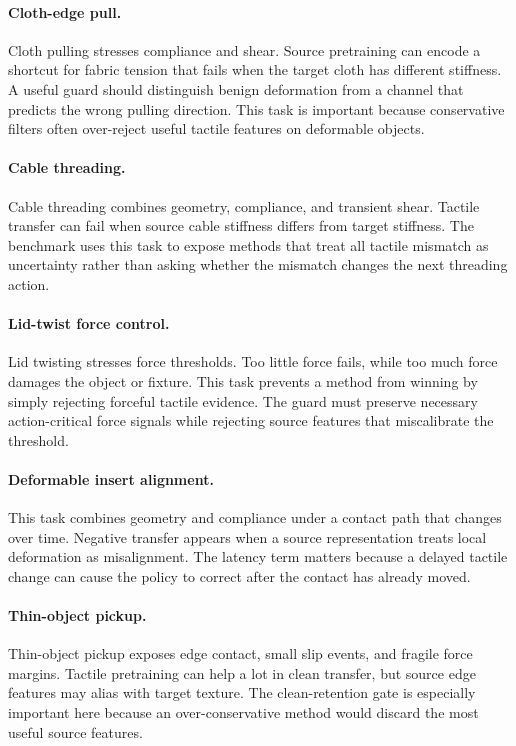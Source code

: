 \documentclass{article}
\begin{document}
\paragraph{Cloth-edge pull.}
Cloth pulling stresses compliance and shear. Source pretraining can encode a shortcut for fabric tension that fails when the target cloth has different stiffness. A useful guard should distinguish benign deformation from a channel that predicts the wrong pulling direction. This task is important because conservative filters often over-reject useful tactile features on deformable objects.

\paragraph{Cable threading.}
Cable threading combines geometry, compliance, and transient shear. Tactile transfer can fail when source cable stiffness differs from target stiffness. The benchmark uses this task to expose methods that treat all tactile mismatch as uncertainty rather than asking whether the mismatch changes the next threading action.

\paragraph{Lid-twist force control.}
Lid twisting stresses force thresholds. Too little force fails, while too much force damages the object or fixture. This task prevents a method from winning by simply rejecting forceful tactile evidence. The guard must preserve necessary action-critical force signals while rejecting source features that miscalibrate the threshold.

\paragraph{Deformable insert alignment.}
This task combines geometry and compliance under a contact path that changes over time. Negative transfer appears when a source representation treats local deformation as misalignment. The latency term matters because a delayed tactile change can cause the policy to correct after the contact has already moved.

\paragraph{Thin-object pickup.}
Thin-object pickup exposes edge contact, small slip events, and fragile force margins. Tactile pretraining can help a lot in clean transfer, but source edge features may alias with target texture. The clean-retention gate is especially important here because an over-conservative method would discard the most useful source features.
\end{document}
